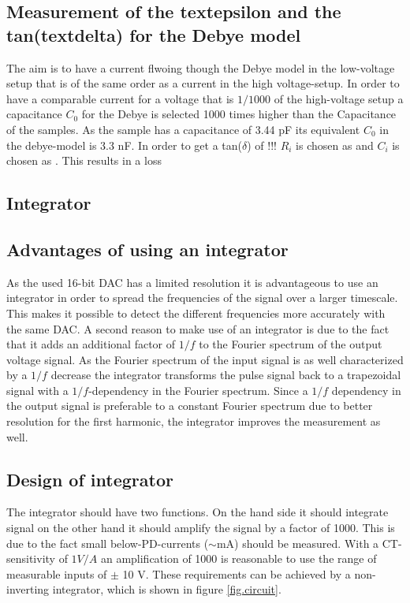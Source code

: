 \subsection{Measurement of the textepsilon and the tan(textdelta) for the Debye model}

The aim is to have a current flwoing though the Debye model in the low-voltage setup that is of the same order as a current in the high voltage-setup. In order to have a comparable current for a voltage that is $1/1000$ of the high-voltage setup a capacitance $C_0$ for the Debye is selected 1000 times higher than the Capacitance of the samples. As the sample has a capacitance of 3.44 pF its equivalent $C_0$ in the debye-model is 3.3 nF. In order to get a tan($\delta$) of !!! $R_i$ is chosen as and $C_i$ is chosen as . This results in a loss 



\subsection{Integrator}
\subsection{Advantages of using an integrator}
As the used 16-bit DAC has a limited resolution it is advantageous to use an integrator in order to spread the frequencies of the signal over a larger timescale. This makes it possible to detect the different frequencies more accurately with the same DAC. 
A second reason to make use of an integrator is due to the fact that it adds an additional factor of $1/f$ to the Fourier spectrum of the output voltage signal. As the Fourier spectrum of the input signal is as well characterized by a $1/f$ decrease the integrator transforms the pulse signal back to a trapezoidal signal with a $1/f$-dependency in the Fourier spectrum. Since a $1/f$ dependency in the output signal is preferable to a constant Fourier spectrum due to better resolution for the first harmonic, the integrator improves the measurement as well. 
\subsection{Design of integrator}
The integrator should have two functions. On the hand side it should integrate signal on the other hand it should amplify the signal by a factor of 1000. This is due to the fact small below-PD-currents ($\sim$mA) should be measured. With a CT-sensitivity of $1V/A$ an amplification of 1000 is reasonable to use the range of measurable inputs of $\pm$ 10 V. These requirements can be achieved by a non-inverting integrator, which is shown in figure  \ref{fig.circuit}. 

